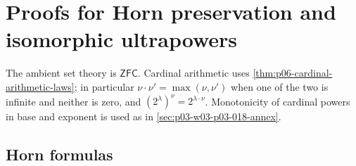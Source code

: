 \section{Proofs for Horn preservation and isomorphic ultrapowers}
\label{sec:p03-w03-p03-017-annex}

The ambient set theory is \(\mathsf{ZFC}\).  Cardinal arithmetic uses
\cref{thm:p06-cardinal-arithmetic-laws}; in particular
\(\nu\cdot\nu'=\max(\nu,\nu')\) when one of the two is infinite and neither
is zero, and \((2^\lambda)^\nu=2^{\lambda\cdot\nu}\).  Monotonicity of
cardinal powers in base and exponent is used as in
\cref{sec:p03-w03-p03-018-annex}.

\subsection{Horn formulas}

